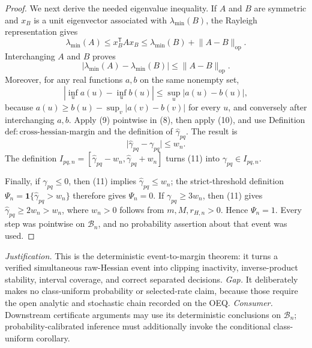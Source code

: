 \documentclass{article}
\begin{document}
\begin{proof}
We next derive the needed eigenvalue inequality.  If \(A\) and \(B\) are symmetric and \(x_B\) is a unit eigenvector associated with \(\lambda_{\min}(B)\), the Rayleigh representation gives
\[
 \lambda_{\min}(A)
 \le x_B^{\mathsf T}Ax_B
 \le\lambda_{\min}(B)+\lVert A-B\rVert_{\mathrm{op}}.
\]
Interchanging \(A\) and \(B\) proves
\[
 \lvert\lambda_{\min}(A)-\lambda_{\min}(B)\rvert
 \le\lVert A-B\rVert_{\mathrm{op}}.
 \tag{9}
\]
Moreover, for any real functions \(a,b\) on the same nonempty set,
\[
 \left\lvert\inf_u a(u)-\inf_u b(u)\right\rvert
 \le\sup_u\lvert a(u)-b(u)\rvert,
 \tag{10}
\]
because \(a(u)\ge b(u)-\sup_v\lvert a(v)-b(v)\rvert\) for every \(u\), and conversely after interchanging \(a,b\).  Apply (9) pointwise in (8), then apply (10), and use Definition \(\mathrm{def:cross\text{-}hessian\text{-}margin}\) and the definition of \(\widehat\gamma_{pq}\).  The result is
\[
 \lvert\widehat\gamma_{pq}-\gamma_{pq}\rvert\le w_n.
 \tag{11}
\]
The definition \(I_{pq,n}=[\widehat\gamma_{pq}-w_n,\widehat\gamma_{pq}+w_n]\) turns (11) into \(\gamma_{pq}\in I_{pq,n}\).

Finally, if \(\gamma_{pq}\le0\), then (11) implies \(\widehat\gamma_{pq}\le w_n\); the strict-threshold definition \(\Psi_n=\mathbf 1\{\widehat\gamma_{pq}>w_n\}\) therefore gives \(\Psi_n=0\).  If \(\gamma_{pq}\ge3w_n\), then (11) gives \(\widehat\gamma_{pq}\ge2w_n>w_n\), where \(w_n>0\) follows from \(m,M,r_{H,n}>0\).  Hence \(\Psi_n=1\).  Every step was pointwise on \(\mathcal B_n\), and no probability assertion about that event was used.
\end{proof}
\par\smallskip\noindent \textit{Justification.} This is the deterministic event-to-margin theorem: it turns a verified simultaneous raw-Hessian event into clipping inactivity, inverse-product stability, interval coverage, and correct separated decisions. \textit{Gap.} It deliberately makes no class-uniform probability or selected-rate claim, because those require the open analytic and stochastic chain recorded on the OEQ. \textit{Consumer.} Downstream certificate arguments may use its deterministic conclusions on \(\mathcal B_n\); probability-calibrated inference must additionally invoke the conditional class-uniform corollary.
\end{document}
